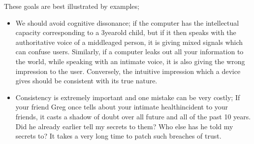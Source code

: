 \documentclass[letterpaper,10pt,english]{jupyterBook}
\begin{document}
\sphinxAtStartPar
These goals are best illustrated by examples;
\begin{itemize}
\item {} 
\sphinxAtStartPar
We should avoid cognitive dissonance; if the computer has the
intellectual capacity corresponding to a 3\sphinxhyphen{}year\sphinxhyphen{}old child, but if it
then speaks with the authoritative voice of a middle\sphinxhyphen{}aged person, it
is giving mixed signals which can confuse users. Similarly, if a
computer leaks out all your information to the world, while speaking
with an intimate voice, it is also giving the wrong impression to
the user. Conversely, the intuitive impression which a device gives
should be consistent with its true nature.

\item {} 
\sphinxAtStartPar
Consistency is extremely important and one mistake can be very
costly; If your friend Greg once tells about your intimate
health\sphinxhyphen{}incident to your friends, it casts a shadow of doubt over all
future and all of the past 10 years. Did he already earlier tell my
secrets to them? Who else has he told my secrets to? It takes a very
long time to patch such breaches of trust.

\end{itemize}
\end{document}
